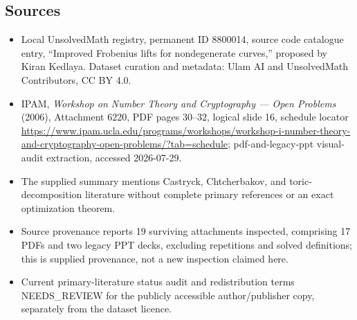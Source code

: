 \documentclass[11pt]{article}
\begin{document}
\subsection{Sources}
\begin{itemize}
\item Local UnsolvedMath registry, permanent ID 8800014, source code catalogue entry, ``Improved Frobenius lifts for nondegenerate curves,'' proposed by Kiran Kedlaya. Dataset curation and metadata: Ulam AI and UnsolvedMath Contributors, CC BY 4.0.
\item IPAM, \emph{Workshop on Number Theory and Cryptography --- Open Problems} (2006), Attachment 6220, PDF pages 30--32, logical slide 16, schedule locator \url{https://www.ipam.ucla.edu/programs/workshops/workshop-i-number-theory-and-cryptography-open-problems/?tab=schedule}; pdf-and-legacy-ppt visual-audit extraction, accessed 2026-07-29.
\item The supplied summary mentions Castryck, Chtcherbakov, and toric-decomposition literature without complete primary references or an exact optimization theorem.
\item Source provenance reports 19 surviving attachments inspected, comprising 17 PDFs and two legacy PPT decks, excluding repetitions and solved definitions; this is supplied provenance, not a new inspection claimed here.
\item Current primary-literature status audit and redistribution terms NEEDS\_REVIEW for the publicly accessible author/publisher copy, separately from the dataset licence.
\end{itemize}
\end{document}
